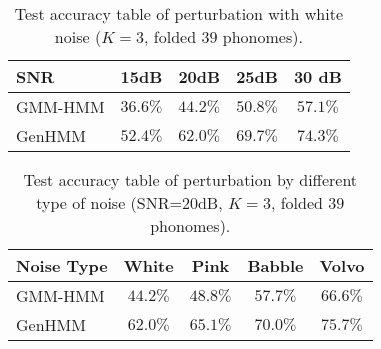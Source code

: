 \documentclass{ecai}
\begin{document}
\begin{table}
  \caption{Test accuracy table of perturbation with white noise ($K=3$, folded $39$ phonomes).}
  \label{tab:acc-classification39f_noise_snr}
  \vspace{-0.1cm}
  \centering
  \begin{tabular}{l|c|c|c|c}
    \toprule
    {SNR} &  15dB &  20dB &  25dB & 30 dB  \\  \midrule
    GMM-HMM & $36.6\%$ &  $44.2\%$ &  $50.8\%$ & $57.1\%$  \\ \midrule
    GenHMM & $52.4\%$ & $62.0\%$ &  $69.7\%$ & $74.3\%$ \\ 
    \bottomrule                                                                  
  \end{tabular}
  \vspace{0.1cm}
\end{table}
\begin{table}
  \caption{Test accuracy table of perturbation by different type of noise (SNR=$20$dB, $K=3$, folded $39$ phonomes).}
  \label{tab:acc-classification39f_noise_type}
  \vspace{-0.1cm}
  \centering
  \begin{tabular}{l|c|c|c|c}
    \toprule
    {Noise Type} &  White &  Pink &  Babble & Volvo  \\  \midrule
    GMM-HMM & $44.2\%$ &  $48.8\%$ &  $57.7\%$ & $66.6\%$  \\ \midrule
    GenHMM & $62.0\%$ & $65.1\%$ &  $70.0\%$ & $75.7\%$ \\ 
    \bottomrule                                                                  
  \end{tabular}
  \vspace{0.3cm}
\end{table}
\end{document}
